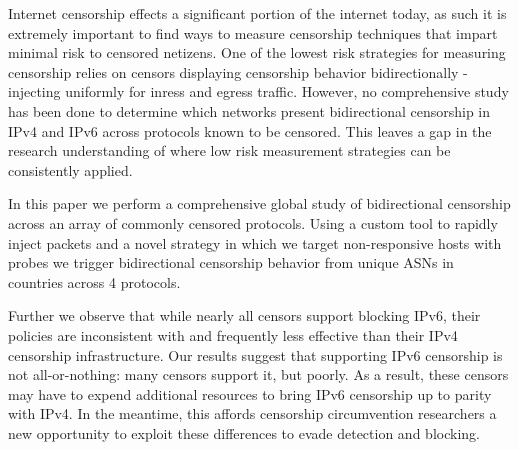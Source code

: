 
Internet censorship effects a significant portion of the internet today, as such
it is extremely important to find ways to measure censorship techniques that impart
minimal risk to censored netizens. One of the lowest risk strategies for measuring
censorship relies on censors displaying censorship behavior bidirectionally -
injecting uniformly for inress and egress traffic. However, no comprehensive
study has been done to determine which networks present bidirectional censorship
in IPv4 and IPv6 across protocols known to be censored. This leaves a gap in the
research understanding of where low risk measurement strategies can be
consistently applied.

In this paper we perform a comprehensive global study of bidirectional
censorship across an array of commonly censored protocols. Using a custom tool
to rapidly inject packets and a novel strategy in which we target non-responsive
hosts with probes we trigger bidirectional censorship behavior from
 unique ASNs in  countries across 4 protocols.

Further we observe that while nearly all censors support blocking IPv6, their
policies are inconsistent with and frequently less effective than their IPv4
censorship infrastructure. Our results suggest that supporting IPv6 censorship
is not all-or-nothing: many censors support it, but poorly.  As a result, these
censors may have to expend additional resources to bring IPv6 censorship up to
parity with IPv4. In the meantime, this affords censorship circumvention
researchers a new opportunity to exploit these differences to evade detection
and blocking.
